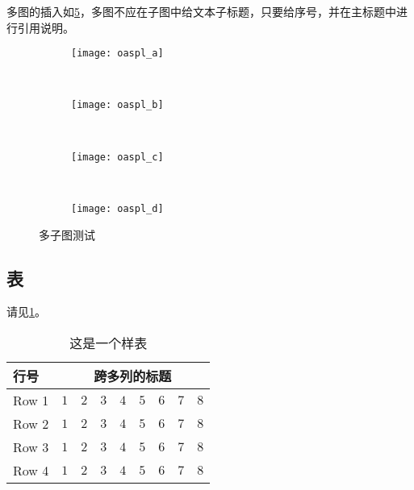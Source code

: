 {多图的插入如\ref{fig:oaspl}，多图不应在子图中给文本子标题，只要给序号，并在主标题中进行引用说明。
\begin{figure}[!htbp]
    \centering
    \begin{subfigure}[b]{0.35\textwidth}
      \texttt{[image: oaspl\_a]}
      \caption{}
      \label{fig:oaspl_a}
    \end{subfigure}%
    ~%
    \begin{subfigure}[b]{0.35\textwidth}
      \texttt{[image: oaspl\_b]}
      \caption{}
      \label{fig:oaspl_b}
    \end{subfigure}
    \\%
    \begin{subfigure}[b]{0.35\textwidth}
      \texttt{[image: oaspl\_c]}
      \caption{}
      \label{fig:oaspl_c}
    \end{subfigure}%
    ~%
    \begin{subfigure}[b]{0.35\textwidth}
      \texttt{[image: oaspl\_d]}
      \caption{}
      \label{fig:oaspl_d}
    \end{subfigure}
    \caption{多子图测试}%
    \label{fig:oaspl}
\end{figure}

\subsection{表}

请见\ref{tab:sample}。
\begin{table}[!htbp]
    \caption{这是一个样表}%
    \label{tab:sample}
    \centering
    \footnotesize%
    \setlength{\tabcolsep}{4pt}%
    \renewcommand{\arraystretch}{1.2}%
    \begin{tabular}{lcccccccc}
        \hline
        行号 & \multicolumn{8}{c}{跨多列的标题}\\
        \hline
        Row 1 & $1$ & $2$ & $3$ & $4$ & $5$ & $6$ & $7$ & $8$\\
        Row 2 & $1$ & $2$ & $3$ & $4$ & $5$ & $6$ & $7$ & $8$\\
        Row 3 & $1$ & $2$ & $3$ & $4$ & $5$ & $6$ & $7$ & $8$\\
        Row 4 & $1$ & $2$ & $3$ & $4$ & $5$ & $6$ & $7$ & $8$\\
        \hline
    \end{tabular}
\end{table}

}
